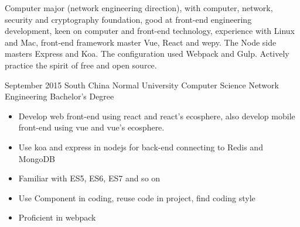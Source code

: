 \documentclass{resume}
\begin{document}
\makeheader

Computer major (network engineering direction), with computer, network, security and cryptography foundation, good at front-end engineering development, keen on computer and front-end technology, experience with Linux and Mac, front-end framework master Vue, React and wepy. The Node side masters Express and Koa. The configuration used Webpack and Gulp. Actively practice the spirit of free and open source.  

\begin{competences}[10em]
\end{competences}

\begin{educations}
  \education%
    {September 2015}%
    {South China Normal University}%
    {Computer Science}%
    {Network Engineering}%
    {Bachelor's Degree}
\end{educations}

\begin{itemize}
  \item Develop web front-end using react and react's ecosphere, also develop mobile front-end using vue and vue's ecosphere.
  \item Use koa and express in nodejs for back-end connecting to Redis and MongoDB
  \item Familiar with ES5, ES6, ES7 and so on
  \item Use Component in coding, reuse code in project, find coding style
  \item Proficient in webpack
\end{itemize}
\end{document}

